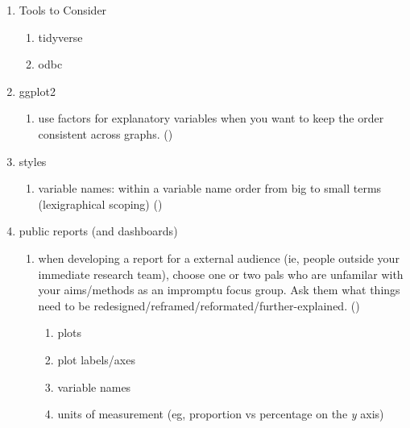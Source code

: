 \documentclass[]{book}
\providecommand{\tightlist}{%
  \setlength{\itemsep}{0pt}\setlength{\parskip}{0pt}}
\begin{document}
\begin{enumerate}
\def\labelenumi{\arabic{enumi}.}
\tightlist
\item
  Tools to Consider

  \begin{enumerate}
  \def\labelenumii{\arabic{enumii}.}
  \tightlist
  \item
    tidyverse
  \item
    odbc
  \end{enumerate}
\item
  ggplot2

  \begin{enumerate}
  \def\labelenumii{\arabic{enumii}.}
  \tightlist
  \item
    use factors for explanatory variables when you want to keep the order consistent across graphs. (\citet{genevamarshall})
  \end{enumerate}
\item
  styles

  \begin{enumerate}
  \def\labelenumii{\arabic{enumii}.}
  \tightlist
  \item
    variable names: within a variable name order from big to small terms (lexigraphical scoping) (\citet{thomasnwilson})
  \end{enumerate}
\item
  public reports (and dashboards)

  \begin{enumerate}
  \def\labelenumii{\arabic{enumii}.}
  \tightlist
  \item
    when developing a report for a external audience (ie, people outside your immediate research team), choose one or two pals who are unfamilar with your aims/methods as an impromptu focus group. Ask them what things need to be redesigned/reframed/reformated/further-explained. (\citet{genevamarshall})

    \begin{enumerate}
    \def\labelenumiii{\arabic{enumiii}.}
    \tightlist
    \item
      plots
    \item
      plot labels/axes
    \item
      variable names
    \item
      units of measurement (eg, proportion vs percentage on the \emph{y} axis)
    \end{enumerate}
  \end{enumerate}
\end{enumerate}
\end{document}
